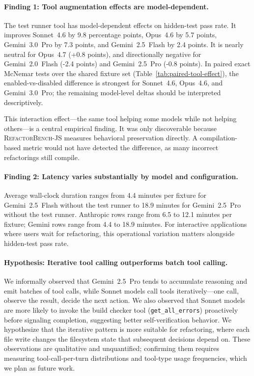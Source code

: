 \documentclass[11pt,letterpaper]{article}
\begin{document}
\paragraph{Finding 1: Tool augmentation effects are model-dependent.} The test runner tool has model-dependent effects on hidden-test pass rate. It improves Sonnet~4.6 by 9.8 percentage points, Opus~4.6 by 5.7 points, Gemini~3.0~Pro by 7.3 points, and Gemini~2.5~Flash by 2.4 points. It is nearly neutral for Opus~4.7 (+0.8 points), and directionally negative for Gemini~2.0~Flash (-2.4 points) and Gemini~2.5~Pro (-0.8 points). In paired exact McNemar tests over the shared fixture set (Table~\ref{tab:paired-tool-effect}), the enabled-vs-disabled difference is strongest for Sonnet~4.6, Opus~4.6, and Gemini~3.0~Pro; the remaining model-level deltas should be interpreted descriptively.

This interaction effect---the same tool helping some models while not helping others---is a central empirical finding. It was only discoverable because \textsc{RefactorBench}-JS measures behavioral preservation directly. A compilation-based metric would not have detected the difference, as many incorrect refactorings still compile.

\paragraph{Finding 2: Latency varies substantially by model and configuration.} Average wall-clock duration ranges from 4.4 minutes per fixture for Gemini~2.5~Flash without the test runner to 18.9 minutes for Gemini~2.5~Pro without the test runner. Anthropic rows range from 6.5 to 12.1 minutes per fixture; Gemini rows range from 4.4 to 18.9 minutes. For interactive applications where users wait for refactoring, this operational variation matters alongside hidden-test pass rate.

\paragraph{Hypothesis: Iterative tool calling outperforms batch tool calling.} We informally observed that Gemini~2.5~Pro tends to accumulate reasoning and emit batches of tool calls, while Sonnet models call tools iteratively---one call, observe the result, decide the next action. We also observed that Sonnet models are more likely to invoke the build checker tool (\texttt{get\_all\_errors}) proactively before signaling completion, suggesting better self-verification behavior. We hypothesize that the iterative pattern is more suitable for refactoring, where each file write changes the filesystem state that subsequent decisions depend on. These observations are qualitative and unquantified; confirming them requires measuring tool-call-per-turn distributions and tool-type usage frequencies, which we plan as future work.
\end{document}
